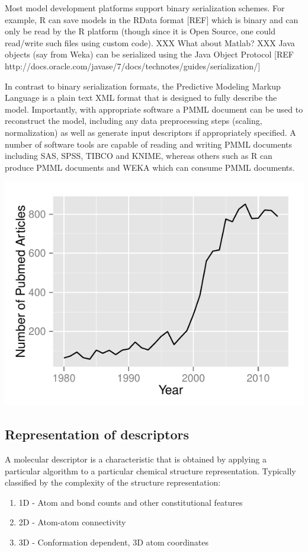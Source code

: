 \documentclass[12pt,letterpaper]{article}
\begin{document}
Most model development platforms support binary serialization
schemes. For example, R can save models in the RData format [REF]
which is binary and can only be read by the R platform (though since
it is Open Source, one could read/write such files using custom
code). XXX What about Matlab? XXX Java objects (say from Weka) can
be serialized using the Java Object Protocol [REF http://docs.oracle.com/javase/7/docs/technotes/guides/serialization/]

In contrast to binary serialization formats, the Predictive Modeling
Markup Language is a plain text XML format that is designed to fully
describe the model. Importantly, with appropriate software a PMML
document can be used to reconstruct the model, including any data
preprocessing steps (scaling, normalization) as well as generate input
descriptors if appropriately specified. A number of software tools are
capable of reading and writing PMML documents including SAS, SPSS,
TIBCO and KNIME, whereas others such as R can produce PMML documents
and WEKA which can consume PMML documents.

{}
{
  \includegraphics{img/count-qsar}
}

\subsection{Representation of descriptors}

A molecular descriptor is a characteristic that is obtained by applying
a particular algorithm to a particular chemical structure representation.
Typically classified by the complexity of the structure representation:
\begin{enumerate}
  \item 1D - Atom and bond counts and other constitutional features
  \item 2D - Atom-atom connectivity
  \item 3D - Conformation dependent, 3D atom coordinates
\end{enumerate}
\end{document}
